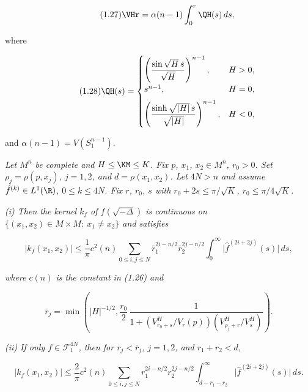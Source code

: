 \begin{equation}\tag{1.27}
\VHr = \alpha(n-1)\int_0^r \QH(s)\,ds,
\end{equation}

where

\begin{equation}\tag{1.28}
\QH(s)=
\begin{cases}
\left(\dfrac{\sin \sqrt{H}\,s}{\sqrt{H}}\right)^{n-1}, & H>0,\\[1.2ex]
s^{n-1}, & H=0,\\[1.2ex]
\left(\dfrac{\sinh \sqrt{|H|}\,s}{\sqrt{|H|}}\right)^{n-1}, & H<0,
\end{cases}
\end{equation}

and $\alpha(n-1)=V(S^{n-1}_1)$.

\begin{theorem}
\label{thm:kernel-estimates-bounded-curvature}

\textit{Let $M^n$ be complete and $H \leq \KM \leq K$. Fix $p$, $x_1$, $x_2 \in M^n$,
$r_0 > 0$. Set $\rho_j = \rho(p,x_j)$, $j=1,2$, and $d = \rho(x_1,x_2)$.
Let $4N > n$ and assume $\hat f^{(k)} \in L^1(\R)$, $0 \le k \le 4N$.
Fix $r$, $r_0$, $s$ with $r_0 + 2s \leq \pi/\sqrt{K}$, $r_0 \leq \pi/4\sqrt{K}$.}

\textit{(i) Then the kernel $k_f$ of $f(\sqrt{-\Delta})$ is continuous on
$\{(x_1,x_2) \in M \times M:\ x_1 \ne x_2\}$ and satisfies}

\begin{equation}\tag{1.29}
|k_f(x_1,x_2)| \leq \frac{1}{\pi} c^2(n) \sum_{0 \le i,j \le N}
\bar r_1^{2i-n/2}\bar r_2^{2j-n/2} \int_0^\infty \bigl|\hat f^{(2i+2j)}(s)\bigr|\,ds,
\end{equation}

\textit{where $c(n)$ is the constant in (1.26) and}

\begin{equation}\tag{1.30}
\bar r_j = \min\!\left(|H|^{-1/2}, \frac{r_0}{2}\,\frac{1}{1 + \left(V^{H}_{r_0+s}/V_r(p)\right)\left(V^{H}_{\rho_j+r}/V^{H}_s\right)}\right).
\end{equation}

\textit{(ii) If only $f \in \mathcal{F}^{4N}_1$, then for $r_j < \bar r_j$, $j=1,2$,
and $r_1 + r_2 < d$,}

\begin{equation}\tag{1.31}
|k_f(x_1,x_2)| \leq \frac{2}{\pi} c^2(n) \sum_{0 \le i,j \le N}
r_1^{2i-n/2}r_2^{2j-n/2} \int_{d-r_1-r_2}^\infty \bigl|\hat f^{(2i+2j)}(s)\bigr|\,ds.
\end{equation}
\end{theorem}


